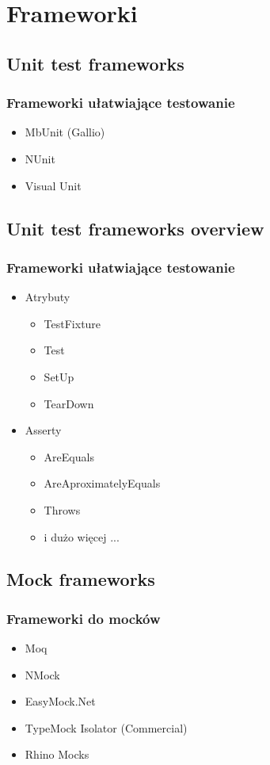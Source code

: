 \documentclass[slidestop,compress,mathserif]{beamer}
\begin{document}
\section{Frameworki}
\subsection{Unit test frameworks}
\begin{frame}
	\frametitle{Frameworki ułatwiające testowanie}
	\begin{itemize}
		\item{MbUnit (Gallio)}
		\pause \item{NUnit}
		\pause \item{Visual Unit}
	\end{itemize}
\end{frame}

\subsection{Unit test frameworks overview}
\begin{frame}
	\frametitle{Frameworki ułatwiające testowanie}
	\begin{itemize}
		\item{Atrybuty}
			\begin{itemize}
				\pause \item{TestFixture}
				\pause \item{Test}
				\pause \item{SetUp}
				\pause \item{TearDown}
			\end{itemize}
		\pause \item{Asserty}
			\begin{itemize}
				\pause \item{AreEquals}
				\pause \item{AreAproximatelyEquals}
				\pause \item{Throws}
				\pause \item{i dużo więcej ...}
			\end{itemize}
	\end{itemize}
\end{frame}
	
\subsection{Mock frameworks}
\begin{frame}
	\frametitle{Frameworki do mocków}
	\begin{itemize}
		\item{Moq}
		\pause \item{NMock}
		\pause \item{EasyMock.Net}
		\pause \item{TypeMock Isolator (Commercial)}
		\pause \item{Rhino Mocks}
	\end{itemize}
\end{frame}
\end{document}
